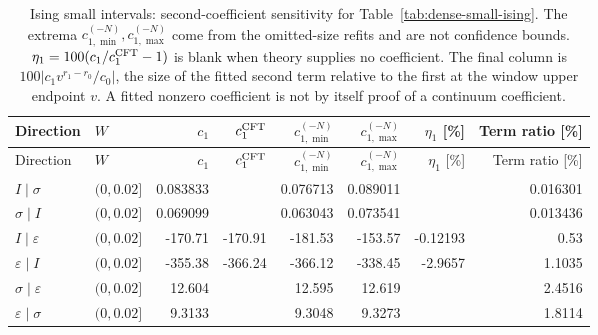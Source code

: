 \begingroup\setlength{\tabcolsep}{3pt}
\begin{longtable}{llrrrrrr}
\caption{Ising small intervals: second-coefficient sensitivity for Table~\ref{tab:dense-small-ising}. The extrema $c_{1,\min}^{(-N)},c_{1,\max}^{(-N)}$ come from the omitted-size refits and are not confidence bounds. $\eta_1=100(c_1/c_1^{\rm CFT}-1)$ is blank when theory supplies no coefficient. The final column is $100|c_1v^{r_1-r_0}/c_0|$, the size of the fitted second term relative to the first at the window upper endpoint $v$. A fitted nonzero coefficient is not by itself proof of a continuum coefficient.}
\label{tab:dense-small-ising-second}\\\toprule
Direction & $W$ & $c_1$ & $c_1^{\rm CFT}$ & $c_{1,\min}^{(-N)}$ & $c_{1,\max}^{(-N)}$ & $\eta_1$ [\%] & Term ratio [\%]\\\midrule
\endfirsthead
\toprule
Direction & $W$ & $c_1$ & $c_1^{\rm CFT}$ & $c_{1,\min}^{(-N)}$ & $c_{1,\max}^{(-N)}$ & $\eta_1$ [\%] & Term ratio [\%]\\\midrule
\endhead
\bottomrule\endfoot
$I\mid \sigma$ & $(0,0.02]$ & 0.083833 &  & 0.076713 & 0.089011 &  & 0.016301\\
$\sigma\mid I$ & $(0,0.02]$ & 0.069099 &  & 0.063043 & 0.073541 &  & 0.013436\\
$I\mid \varepsilon$ & $(0,0.02]$ & -170.71 & -170.91 & -181.53 & -153.57 & -0.12193 & 0.53\\
$\varepsilon\mid I$ & $(0,0.02]$ & -355.38 & -366.24 & -366.12 & -338.45 & -2.9657 & 1.1035\\
$\sigma\mid \varepsilon$ & $(0,0.02]$ & 12.604 &  & 12.595 & 12.619 &  & 2.4516\\
$\varepsilon\mid \sigma$ & $(0,0.02]$ & 9.3133 &  & 9.3048 & 9.3273 &  & 1.8114\\
\end{longtable}
\endgroup
